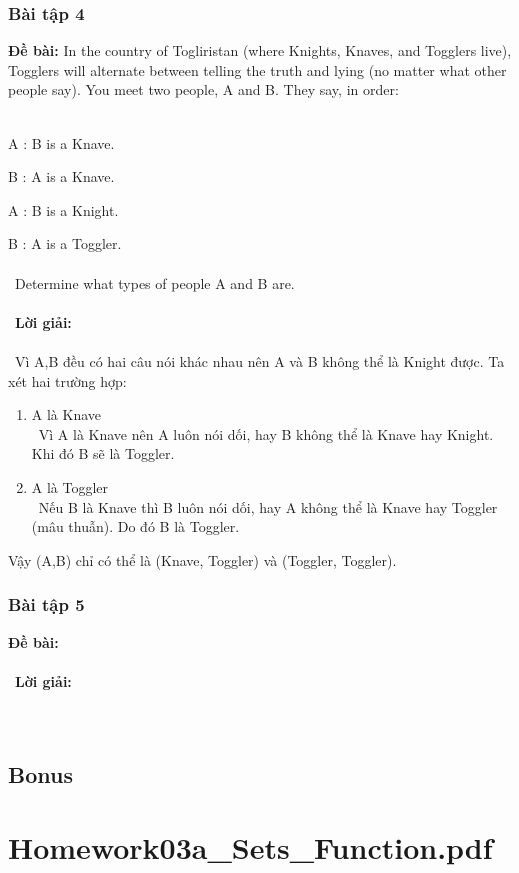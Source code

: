 \documentclass[a4paper]{article}
\begin{document}
\subsubsection{Bài tập 4}
\textbf{Đề bài:} In the country of Togliristan (where Knights, Knaves, and Togglers live), Togglers will alternate between telling the truth and lying (no matter what other people say). You meet two people, A and B. They say, in order: \\\

A : B is a Knave. 

B : A is a Knave.

A : B is a Knight.

B : A is a Toggler.\\\ \\\
Determine what types of people A and B are. \\\ \\\
\textbf{Lời giải:} \\\ \\\
Vì A,B đều có hai câu nói khác nhau nên A và B không thể là Knight được. Ta xét hai trường hợp: 
\begin{enumerate}
\item A là Knave \\\
Vì A là Knave nên A luôn nói dối, hay B không thể là Knave hay Knight. Khi đó B sẽ là Toggler.
\item A là Toggler \\\
Nếu B là Knave thì B luôn nói dối, hay A không thể là Knave hay Toggler (mâu thuẫn). Do đó B là Toggler.
\end{enumerate}
Vậy (A,B) chỉ có thể là (Knave, Toggler) và (Toggler, Toggler).

\clearpage
\subsubsection{Bài tập 5}
\textbf{Đề bài:} 
\\\ \\\
\textbf{Lời giải:} \\\ \\\
\clearpage
\subsection{Bonus}
\clearpage

\section{Homework03a\_Sets\_Function.pdf}
\end{document}

